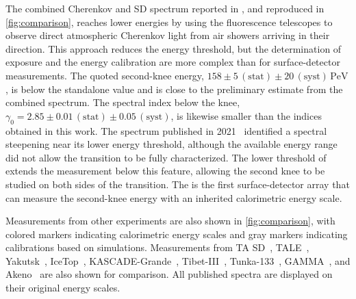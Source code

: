 \documentclass[main.tex]{subfiles}
\begin{document}
The combined Cherenkov and SD spectrum reported in \cite{Novotny:2021:CherenkovSpectrum}, and reproduced in \cref{fig:comparison}, reaches lower energies by using the fluorescence telescopes to observe direct atmospheric Cherenkov light from air showers arriving in their direction.
This approach reduces the energy threshold, but the determination of exposure and the energy calibration are more complex than for surface-detector measurements.
The quoted second-knee energy, $158\pm5\,\mathrm{(stat)}\pm20\,\mathrm{(syst)}\,\mathrm{PeV}$, is below the standalone  value and is close to the preliminary estimate from the combined spectrum.
The spectral index below the knee, $\gamma_0=2.85\pm0.01\,\mathrm{(stat)}\pm0.05\,\mathrm{(syst)}$, is likewise smaller than the indices obtained in this work.
The  spectrum published in 2021~\cite{PierreAuger:2021:InfillSpectrum} identified a spectral steepening near its lower energy threshold, although the available energy range did not allow the transition to be fully characterized.
The lower threshold of  extends the measurement below this feature, allowing the second knee to be studied on both sides of the transition.
The  is the first surface-detector array that can measure the second-knee energy with an inherited calorimetric energy scale.

Measurements from other experiments are also shown in \cref{fig:comparison}, with colored markers indicating calorimetric energy scales and gray markers indicating calibrations based on simulations.
Measurements from TA SD~\cite{Ivanov:2019:TASD}, TALE~\cite{TALE:2018:SecondKnee}, Yakutsk~\cite{Knurenko:2015:Yakutsk}, IceTop~\cite{IceCube:2019:IceTop}, KASCADE-Grande~\cite{Bertaina:2015:KascadeGrande}, Tibet-III~\cite{Amenomori:2008:Tibet}, Tunka-133~\cite{Budnev:2020:Tunka133}, GAMMA~\cite{TerAntonyan:2014:GAMMA}, and Akeno~\cite{Nagano:1992:Akeno} are also shown for comparison. All published spectra are displayed on their original energy scales.
\end{document}
